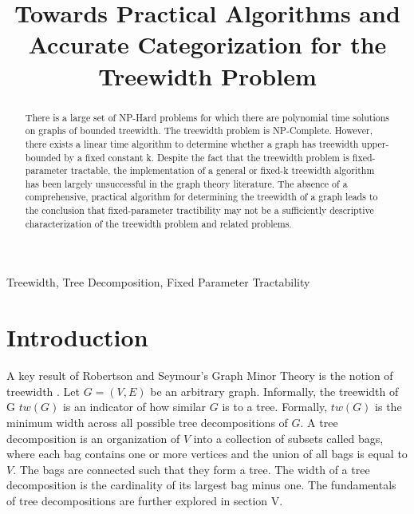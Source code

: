 \documentclass[12pt,conference]{IEEEtran}
\theoremstyle{plain}
\begin{document}
\raggedbottom

\title{Towards Practical Algorithms and Accurate Categorization for the Treewidth Problem}

\author{
}

\maketitle

\begin{abstract}
There is a large set of NP-Hard problems for which there are polynomial time solutions on graphs of bounded treewidth. The treewidth problem is NP-Complete. However, there exists a linear time algorithm to determine whether a graph has treewidth upper-bounded by a fixed constant k. Despite the fact that the treewidth problem is fixed-parameter tractable, the implementation of a general or fixed-k treewidth algorithm has been largely unsuccessful in the graph theory literature. The absence of a comprehensive, practical algorithm for determining the treewidth of a graph leads to the conclusion that fixed-parameter tractibility may not be a sufficiently descriptive characterization of the treewidth problem and related problems.
\end{abstract}

\begin{IEEEkeywords}
Treewidth, Tree Decomposition, Fixed Parameter Tractability
\end{IEEEkeywords}

\IEEEpeerreviewmaketitle

\section{Introduction}
A key result of Robertson and Seymour's Graph Minor Theory is the notion of treewidth \cite{treewidth-rob-seymour}. Let $G = (V,E)$ be an arbitrary graph. Informally, the treewidth of G $tw(G)$ is an indicator of how similar $G$ is to a tree. Formally, $tw(G)$ is the minimum width across all possible tree decompositions of $G$. A tree decomposition is an organization of $V$ into a collection of subsets called bags, where each bag contains one or more vertices and the union of all bags is equal to $V$. The bags are connected such that they form a tree. The width of a tree decomposition is the cardinality of its largest bag minus one. The fundamentals of tree decompositions are further explored in section V.
\end{document}
